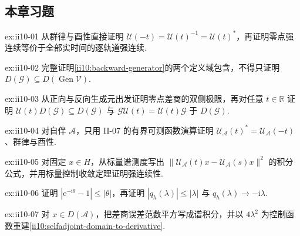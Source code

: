 \subsection*{本章习题}\label{sec:ii10-exercises}

\begin{FAExercise}{ex:ii10-01}
从群律与酉性直接证明 \(\displaystyle\mathcal U(-t)=\mathcal U(t)^{-1}=\mathcal U(t)^*\)，再证明零点强连续等价于全部实时间的逐轨道强连续.
\end{FAExercise}

\begin{FAExercise}[反向生成元与定义域等式]{ex:ii10-02}
完整证明\autoref{ii10:backward-generator}的两个定义域包含，不得只证明 \(\displaystyle D(\mathcal G)\subseteq D(\operatorname{Gen}\mathcal V)\).
\end{FAExercise}

\begin{FAExercise}[双侧导数与生成元交换]{ex:ii10-03}
从正向与反向生成元出发证明零点差商的双侧极限，再对任意 \(\displaystyle t\in\mathbb R\) 证明 \(\displaystyle\mathcal U(t)D(\mathcal G)\subseteq D(\mathcal G)\) 与 \(\displaystyle\mathcal G\mathcal U(t)=\mathcal U(t)\mathcal G\) 于 \(\displaystyle D(\mathcal G)\).
\end{FAExercise}

\begin{FAExercise}{ex:ii10-04}
对自伴 \(\displaystyle\mathcal A\)，只用 II-07 的有界可测函数演算证明 \(\displaystyle\mathcal U_{\mathcal A}(t)^*=\mathcal U_{\mathcal A}(-t)\)、群律与酉性.
\end{FAExercise}

\begin{FAExercise}{ex:ii10-05}
对固定 \(\displaystyle x\in H\)，从标量谱测度写出 \(\displaystyle\|\mathcal U_{\mathcal A}(t)x-\mathcal U_{\mathcal A}(s)x\|^2\) 的积分公式，并用标量控制收敛定理证明强连续性.
\end{FAExercise}

\begin{FAExercise}[谱差商估计]{ex:ii10-06}
证明 \(\displaystyle|\mathrm{e}^{-\mathrm{i}\theta}-1|\leqslant|\theta|\)，再证明 \(\displaystyle|q_h(\lambda)|\leqslant|\lambda|\) 与 \(\displaystyle q_h(\lambda)\to-\mathrm{i}\lambda\).
\end{FAExercise}

\begin{FAExercise}[自伴域推出导数]{ex:ii10-07}
对 \(\displaystyle x\in D(\mathcal A)\)，把差商误差范数平方写成谱积分，并以 \(\displaystyle4\lambda^2\) 为控制函数重建\autoref{ii10:selfadjoint-domain-to-derivative}.
\end{FAExercise}

